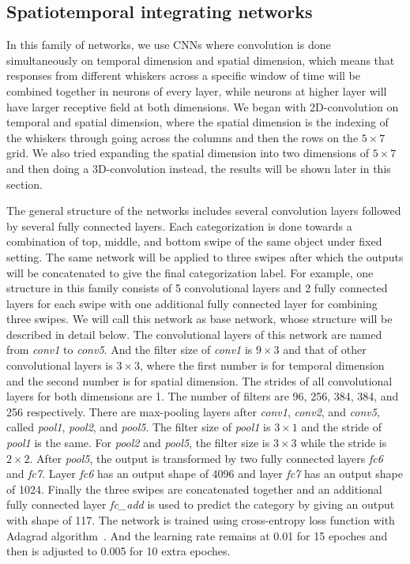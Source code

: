 \subsection{Spatiotemporal integrating networks}

In this family of networks, we use CNNs where convolution is done simultaneously on temporal dimension and spatial dimension, which means that responses from different whiskers across a specific window of time will be combined together in neurons of every layer, while neurons at higher layer will have larger receptive field at both dimensions.
We began with 2D-convolution on temporal and spatial dimension, where the spatial dimension is the indexing of the whiskers through going across the columns and then the rows on the $5\times7$ grid.
We also tried expanding the spatial dimension into two dimensions of $5\times7$ and then doing a 3D-convolution instead, the results will be shown later in this section.

The general structure of the networks includes several convolution layers followed by several fully connected layers. Each categorization is done towards a combination of top, middle, and bottom swipe of the same object under fixed setting.
The same network will be applied to three swipes after which the outputs will be concatenated to give the final categorization label.
For example, one structure in this family consists of 5 convolutional layers and 2 fully connected layers for each swipe with one additional fully connected layer for combining three swipes.
We will call this network as base network, whose structure will be described in detail below.
The convolutional layers of this network are named from \textit{conv1} to \textit{conv5}.
And the filter size of \textit{conv1} is $9\times3$ and that of other convolutional layers is $3\times3$, where the first number is for temporal dimension and the second number is for spatial dimension.
The strides of all convolutional layers for both dimensions are 1. The number of filters are 96, 256, 384, 384, and 256 respectively.
There are max-pooling layers after \textit{conv1}, \textit{conv2}, and \textit{conv5}, called \textit{pool1}, \textit{pool2}, and \textit{pool5}. The filter size of \textit{pool1} is $3\times1$ and the stride of \textit{pool1} is the same.
For \textit{pool2} and \textit{pool5}, the filter size is $3\times3$ while the stride is $2\times2$.
After \textit{pool5}, the output is transformed by two fully connected layers \textit{fc6} and \textit{fc7}. Layer \textit{fc6} has an output shape of 4096 and layer \textit{fc7} has an output shape of 1024.
Finally the three swipes are concatenated together and an additional fully connected layer \textit{fc\_add} is used to predict the category by giving an output with shape of 117.
The network is trained using cross-entropy loss function with Adagrad algorithm~\cite{duchi2011adaptive}.
And the learning rate remains at 0.01 for 15 epoches and then is adjusted to 0.005 for 10 extra epoches.

